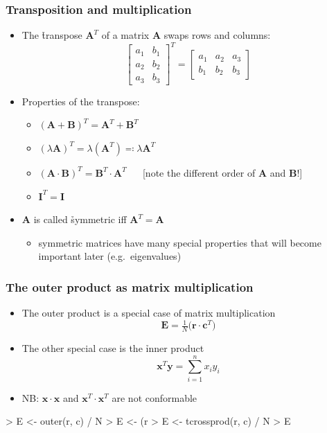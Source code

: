 \documentclass[t]{beamer} %
\begin{document}
\begin{frame}
  \frametitle{Transposition and multiplication}

  \begin{itemize}
  \item The \h{transpose} $\mathbf{A}^T$ of a matrix $\mathbf{A}$ swaps rows and columns:
    \[
    \begin{bmatrix}
      a_1 & b_1 \\
      a_2 & b_2 \\
      a_3 & b_3 
    \end{bmatrix}^T
    =
    \begin{bmatrix}
      a_1 & a_2 & a_3 \\
      b_1 & b_2 & b_3
    \end{bmatrix}
    \]
    \pause
  \item Properties of the transpose: 
    \begin{itemize}
    \item $(\mathbf{A} + \mathbf{B})^T = \mathbf{A}^T + \mathbf{B}^T$
    \item $(\lambda \mathbf{A})^T = \lambda (\mathbf{A}^T) \eqcolon \lambda \mathbf{A}^T$
    \item $(\mathbf{A}\cdot \mathbf{B})^T = \mathbf{B}^T\cdot \mathbf{A}^T$
      $\quad$ [note the different order of $\mathbf{A}$ and $\mathbf{B}$!]
    \item $\mathbf{I}^T = \mathbf{I}$
    \end{itemize}
    \pause
  \item $\mathbf{A}$ is called \h{symmetric} iff $\mathbf{A}^T = \mathbf{A}$
    \begin{itemize}
    \item symmetric matrices have many special properties that will become
      important later (e.g.\ eigenvalues)
    \end{itemize}
  \end{itemize}
\end{frame}

\begin{frame}[fragile]
  \frametitle{The outer product as matrix multiplication}
  
  \ungap[1]
  \begin{itemize}
  \item The outer product is a special case of matrix multiplication
    \[
    \mathbf{E} = \tfrac{1}{N} \bigl( \mathbf{r} \cdot \mathbf{c}^T \big)
    \]
  \item<2-> The other special case is the \h{inner product}
    \[
    \mathbf{x}^T \mathbf{y} = \sum_{i=1}^n x_i y_i
    \]
  \item<2-> NB: $\mathbf{x}\cdot \mathbf{x}$ and $\mathbf{x}^T\cdot \mathbf{x}^T$ are not conformable
  \end{itemize}

\ungap[1]  
\begin{Rcode}
> E <- outer(r, c) / N
> E <- (r %
> E <- tcrossprod(r, c) / N
> E
\end{Rcode}
\end{frame}
\end{document}
